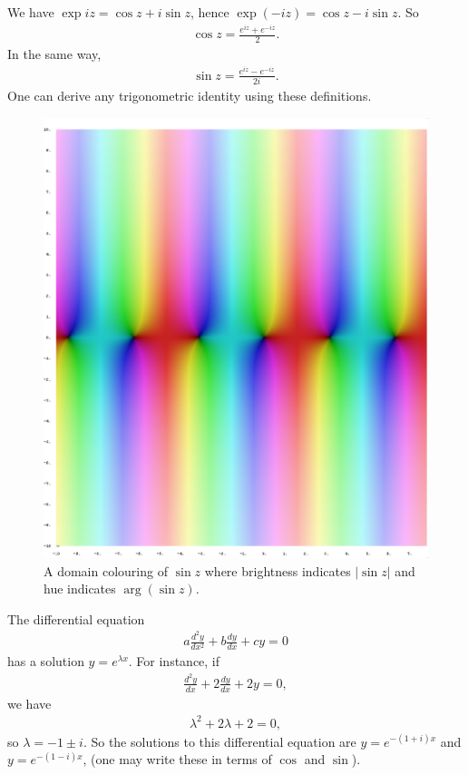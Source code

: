 \documentclass[11pt, oneside,margin=1in]{article}
\begin{document}
We have $\exp iz = \cos z + i\sin z$, hence $\exp (-iz)=\cos z - i\sin z$. So
\begin{align*}
	\cos z = \frac{e^{iz}+ e^{-iz}}{2}.
\end{align*}
In the same way,
\begin{align*}
	\sin z = \frac{e^{iz}-e^{-iz}}{2i}.
\end{align*}
One can derive any trigonometric identity using these definitions.
 \begin{figure}
	 \begin{center}
	 	\includegraphics[scale=0.2]{sin_z}
		\caption{A domain colouring of $\sin z$ where brightness indicates $\left\lvert \sin z \right\rvert $ and hue indicates $\arg(\sin z)$.}
	 \end{center}
\end{figure}
The differential equation
\begin{align*}
	a \frac{d^2y}{dx^2}+ b \frac{dy}{dx}+cy =0
\end{align*}
has a solution $y=e^{\lambda x} $. For instance, if
\begin{align*}
	\frac{d^2y}{dx}+2\frac{dy}{dx}+2y =0,
\end{align*}
we have
\begin{align*}
	\lambda ^2 + 2\lambda + 2 =0,
\end{align*}
so $\lambda = -1\pm i$. So the solutions to this differential equation are $y=e^{-(1+i)x}$ and $y = e^{-(1-i)x}$, (one may write these in terms of $\cos$ and $\sin$).
\end{document}
